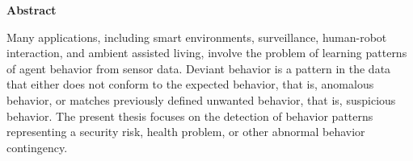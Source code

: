 

  \cleardoublepage
  \thispagestyle{fancy}
  \fancyhead{}
  \fancyfoot{}
  \fancyhead[RO]{\thepage}
  \fancyhead[LO]{}
  \fancyhead[LE]{\thepage}
  \vspace{-2.4cm} 
  {\noindent \Large \bfseries Abstract}
  \vspace{1.5cm}

\vspace{-1mm}

\noindent
Many applications, including smart environments, surveillance, human-robot interaction, and ambient assisted living, involve the problem of learning patterns of agent behavior from sensor data. Deviant behavior is a pattern in the data that either does not conform to the expected behavior, that is, anomalous behavior, or matches previously defined unwanted behavior, that is, suspicious behavior. The present thesis focuses on the detection of behavior patterns representing a security risk, health problem, or  other abnormal behavior contingency. 

